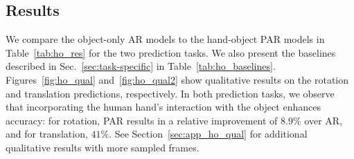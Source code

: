 



\subsection{Results}
We compare the object-only AR models to the hand-object PAR models in Table~\ref{tab:ho_res} for the two prediction tasks. We also present the baselines described in Sec.~\ref{sec:task-specific} in Table~\ref{tab:ho_baselines}. Figures~\ref{fig:ho_qual} and~\ref{fig:ho_qual2} show qualitative results on the rotation and translation predictions, respectively. In both prediction tasks, we observe that incorporating the human hand's interaction with the object enhances accuracy: for rotation, PAR results in a relative improvement of $8.9\%$ over AR, and for translation, $41\%$. See Section~\ref{sec:app_ho_qual} for additional qualitative results with more sampled frames.

